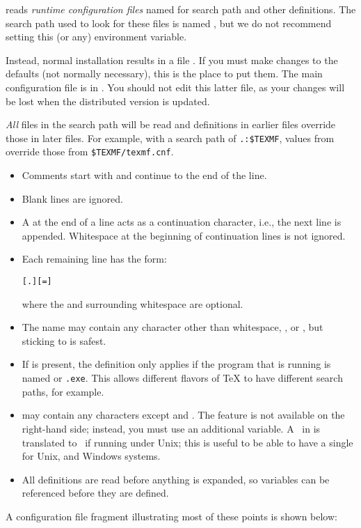 \documentclass{article}
\begin{document}
\KPS{} reads \emph{runtime configuration files} named 
for search path and other definitions.  The search path used to look
for these files is named , but we do not recommend
setting this (or any) environment variable.

Instead, normal installation results in a file
.  If you must make changes to the defaults
(not normally necessary), this is the place to put them.  The main
configuration file is in .
You should not edit this latter file, as your changes will be lost when
the distributed version is updated.

\emph{All}  files in the search path will be read and
definitions in earlier files override those in later files.  For
example, with a search path of \verb|.:$TEXMF|, values from
 override those from \verb|$TEXMF/texmf.cnf|.

\begin{itemize}
\item
  Comments start with \code{\%} and continue to the end of the line.
\item
  Blank lines are ignored.
\item
  A \bs{} at the end of a line acts as a continuation character,
  i.e., the next line is appended.  Whitespace at the beginning of
  continuation lines is not ignored.
\item
  Each remaining line has the form:
\begin{alltt}
  [.] [=] 
\end{alltt}%
  where the \samp{=} and surrounding whitespace are optional.
\item
  The  name may contain any character other
  than whitespace, \samp{=}, or , but sticking to
   is safest.
\item
  If  is present, the definition only
  applies if the program that is running is named
  \texttt{} or \texttt{.exe}.  This allows
  different flavors of \TeX{} to have different search paths, for
  example.
\item {} may contain any characters except
  \code{\%} and .  The
   feature is not available on the
  right-hand side; instead, you must use an additional variable.  A
  \samp{;}\ in  is translated to \samp{:}\ if
  running under Unix; this is useful to be able to have a single
   for Unix,  and Windows systems.
\item
  All definitions are read before anything is expanded, so
  variables can be referenced before they are defined.
\end{itemize}
A configuration file fragment illustrating most of these points is
\ifSingleColumn
shown below:
\end{document}
